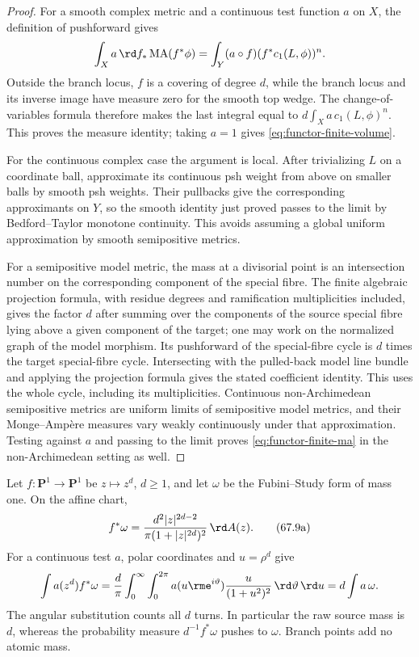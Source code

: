 \begin{proof}
For a smooth complex metric and a continuous test function $a$ on $X$,
the definition of pushforward gives
\[
 \int_X a\,\rd f_*\operatorname{MA}(f^*\phi)
   =\int_Y(a\circ f)(f^*c_1(L,\phi))^n.
\]
Outside the branch locus, $f$ is a covering of degree $d$, while the
branch locus and its inverse image have measure zero for the smooth top
wedge. The change-of-variables formula therefore makes the last integral
equal to $d\int_Xa\,c_1(L,\phi)^n$. This proves the measure identity;
taking $a=1$ gives \eqref{eq:functor-finite-volume}.

For the continuous complex case the argument is local.  After trivializing
$L$ on a coordinate ball, approximate its continuous psh weight from
above on smaller balls by smooth psh weights.  Their pullbacks give the
corresponding approximants on $Y$, so the smooth identity just proved
passes to the limit by Bedford--Taylor monotone continuity.  This avoids
assuming a global uniform approximation by smooth semipositive metrics.

For a semipositive model metric, the mass at a divisorial point is an
intersection number on the corresponding component of the special fibre.
The finite algebraic projection formula, with residue degrees and
ramification multiplicities included, gives the factor $d$ after summing
over the components of the source special fibre lying above a given
component of the target; one may work on the normalized graph of the model morphism.
Its pushforward of the special-fibre cycle is $d$ times the target
special-fibre cycle. Intersecting with the pulled-back model line bundle
and applying the projection formula gives the stated coefficient identity.
This uses the whole cycle, including its multiplicities. Continuous non-Archimedean semipositive metrics are uniform
limits of semipositive model metrics, and their Monge--Amp\`ere measures vary
weakly continuously under that approximation. Testing against $a$ and
passing to the limit proves \eqref{eq:functor-finite-ma} in the
non-Archimedean setting as well.
\end{proof}

\begin{example}
\label{ex:functor-branched-ma}
Let $f:\mathbf P^1\to\mathbf P^1$ be $z\mapsto z^d$, $d\geq1$, and
let $\omega$ be the Fubini--Study form of mass one. On the affine chart,
\[
 f^*\omega=
 \frac{d^2|z|^{2d-2}}{\pi(1+|z|^{2d})^2}\,\rd A(z).
\tag{67.9a}\label{eq:functor-branched-density}
\]
For a continuous test $a$, polar coordinates and $u=\rho^d$ give
\[
 \int a(z^d)f^*\omega
 =\frac d\pi\int_0^\infty\int_0^{2\pi}
       a(u\rme^{i\vartheta})\frac{u}{(1+u^2)^2}
       \,\rd\vartheta\,\rd u=d\int a\,\omega.
\]
The angular substitution counts all $d$ turns. In particular the raw
source mass is $d$, whereas the probability measure $d^{-1}f^*\omega$
pushes to $\omega$. Branch points add no atomic mass.
\end{example}

